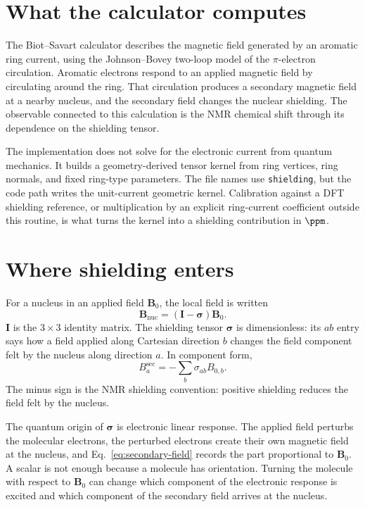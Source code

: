 \documentclass[11pt]{article}
\begin{document}

\section{What the calculator computes}

The Biot--Savart calculator describes the magnetic field generated by an
aromatic ring current, using the Johnson--Bovey two-loop model of the
\(\pi\)-electron circulation. Aromatic electrons respond to an applied magnetic
field by circulating around the ring. That circulation produces a secondary
magnetic field at a nearby nucleus, and the secondary field changes the nuclear
shielding. The observable connected to this calculation is the NMR chemical
shift through its dependence on the shielding tensor.

The implementation does not solve for the electronic current from quantum
mechanics. It builds a geometry-derived tensor kernel from ring vertices, ring
normals, and fixed ring-type parameters. The file names use
\texttt{shielding}, but the code path writes the unit-current geometric kernel.
Calibration against a DFT shielding reference, or multiplication by an
explicit ring-current coefficient outside this routine, is what turns the
kernel into a shielding contribution in \(\si{\ppm}\).

\section{Where shielding enters}

For a nucleus in an applied field \(\bm B_0\), the local field is written
\begin{equation}
  \bm B_{\mathrm{nuc}}=(\bm I-\bm\sigma)\bm B_0 .
  \label{eq:local-field}
\end{equation}
\(\bm I\) is the \(3\times3\) identity matrix. The shielding tensor
\(\bm\sigma\) is dimensionless: its \(ab\) entry says how a field applied along
Cartesian direction \(b\) changes the field component felt by the nucleus along
direction \(a\). In component form,
\begin{equation}
  B^{\mathrm{sec}}_a=-\sum_b \sigma_{ab} B_{0,b}.
  \label{eq:secondary-field}
\end{equation}
The minus sign is the NMR shielding convention: positive shielding reduces the
field felt by the nucleus.

The quantum origin of \(\bm\sigma\) is electronic linear response. The applied
field perturbs the molecular electrons, the perturbed electrons create their
own magnetic field at the nucleus, and Eq.~\eqref{eq:secondary-field} records
the part proportional to \(\bm B_0\). A scalar is not enough because a molecule
has orientation. Turning the molecule with respect to \(\bm B_0\) can change
which component of the electronic response is excited and which component of
the secondary field arrives at the nucleus.
\end{document}
